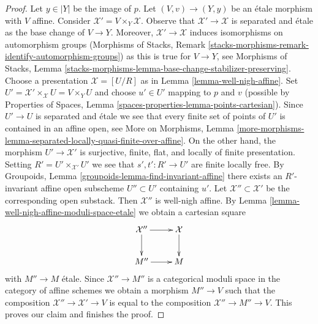 \documentclass[10pt,a4paper]{amsart}
\theoremstyle{plain}
\theoremstyle{definition}
\theoremstyle{remark}
\numberwithin{equation}{subsection}
\begin{document}
\begin{proof}
\medskip\noindent
Let $y \in |Y|$ be the image of $p$.
Let $(V, v) \to (Y, y)$ be an \'etale morphism with $V$ affine.
Consider $\mathcal{X}' = V \times_Y \mathcal{X}$.
Observe that $\mathcal{X}' \to \mathcal{X}$ is separated and \'etale
as the base change of $V \to Y$. Moreover, $\mathcal{X}' \to \mathcal{X}$
induces isomorphisms on automorphism groups
(Morphisms of Stacks, Remark
\ref{stacks-morphisms-remark-identify-automorphism-groups})
as this is true for
$V \to Y$, see Morphisms of Stacks, Lemma
\ref{stacks-morphisms-lemma-base-change-stabilizer-preserving}.
Choose a presentation $\mathcal{X} = [U/R]$
as in Lemma \ref{lemma-well-nigh-affine}.
Set $U' = \mathcal{X}' \times_\mathcal{X} U = V \times_Y U$
and choose $u' \in U'$ mapping to $p$ and $v$ (possible
by Properties of Spaces, Lemma \ref{spaces-properties-lemma-points-cartesian}).
Since $U' \to U$ is separated and \'etale we see that
every finite set of points of $U'$ is contained in an affine open, see
More on Morphisms, Lemma
\ref{more-morphisms-lemma-separated-locally-quasi-finite-over-affine}.
On the other hand, the morphism $U' \to \mathcal{X}'$ is
surjective, finite, flat, and locally of finite presentation.
Setting $R' = U' \times_{\mathcal{X}'} U'$ we see
that $s', t' : R' \to U'$ are finite locally free.
By Groupoids, Lemma \ref{groupoids-lemma-find-invariant-affine}
there exists an $R'$-invariant affine open subscheme $U'' \subset U'$
containing $u'$.
Let $\mathcal{X}'' \subset \mathcal{X}'$ be
the corresponding open substack. Then $\mathcal{X}''$ is
well-nigh affine. By Lemma \ref{lemma-well-nigh-affine-moduli-space-etale}
we obtain a cartesian square
$$
\xymatrix{
\mathcal{X}'' \ar[r] \ar[d] & \mathcal{X} \ar[d] \\
M'' \ar[r] & M
}
$$
with $M'' \to M$ \'etale. Since $\mathcal{X}'' \to M''$ is
a categorical moduli space in the category of affine schemes
we obtain a morphism $M'' \to V$ such that the composition
$\mathcal{X}'' \to \mathcal{X}' \to V$ is equal to the composition
$\mathcal{X}'' \to M'' \to V$. This proves our claim and finishes
the proof.
\end{proof}
\end{document}
